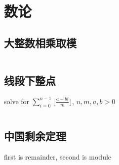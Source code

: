 \chapter{数论}
\section{大整数相乘取模}
\inputminted{cpp}{\source/number-theory/biginteger-multiply.cpp}
\section{线段下整点}
solve for $\sum_{i=0}^{n-1} \lfloor \frac{a+bi}{m}\rfloor$, $n,m,a,b>0$
\inputminted{cpp}{\source/number-theory/integer-lattice-under-segment.cpp}
\section{中国剩余定理}
first is remainder, second is module
\inputminted{cpp}{\source/number-theory/CRT.cpp}